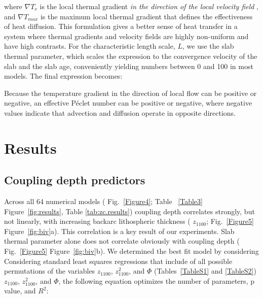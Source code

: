 \documentclass[draft,linenumbers]{agujournal2018} %
\providecommand{\DIFaddtex}[1]{{\protect\color{blue} \sf #1}} %
\providecommand{\DIFdeltex}[1]{{\protect\color{red} \scriptsize #1}} %
\providecommand{\DIFaddbegin}{} %
\providecommand{\DIFaddend}{} %
\providecommand{\DIFdelbegin}{} %
\providecommand{\DIFdelend}{} %
\providecommand{\DIFadd}[1]{\texorpdfstring{\DIFaddtex{#1}}{#1}} %
\providecommand{\DIFdel}[1]{\texorpdfstring{\DIFdeltex{#1}}{}} %
\newcommand{\DIFscaledelfig}{0.3}
\newlength{\DIFdelgraphicswidth} %
\newlength{\DIFdelgraphicsheight} %
\newcommand{\DIFaddincludegraphics}[2][]{{\color{blue}\fbox{\DIFOincludegraphics[#1]{#2}}}} %
\newcommand{\DIFdelincludegraphics}[2][]{%
\sbox{\DIFdelgraphicsbox}{\DIFOincludegraphics[#1]{#2}}%
\settoboxwidth{\DIFdelgraphicswidth}{\DIFdelgraphicsbox} %
\settoboxtotalheight{\DIFdelgraphicsheight}{\DIFdelgraphicsbox} %
\scalebox{\DIFscaledelfig}{%
\parbox[b]{\DIFdelgraphicswidth}{\usebox{\DIFdelgraphicsbox}\\[-\baselineskip] \rule{\DIFdelgraphicswidth}{0em}}\llap{\resizebox{\DIFdelgraphicswidth}{\DIFdelgraphicsheight}{%
\setlength{\unitlength}{\DIFdelgraphicswidth}%
\begin{picture}(1,1)%
\thicklines\linethickness{2pt} %
{\color[rgb]{1,0,0}\put(0,0){\framebox(1,1){}}}%
{\color[rgb]{1,0,0}\put(0,0){\line( 1,1){1}}}%
{\color[rgb]{1,0,0}\put(0,1){\line(1,-1){1}}}%
\end{picture}%
}\hspace*{3pt}}} %
} %
\DeclareRobustCommand{\DIFaddbegin}{\DIFOaddbegin \let\includegraphics\DIFaddincludegraphics} %
\DeclareRobustCommand{\DIFaddend}{\DIFOaddend \let\includegraphics\DIFOincludegraphics} %
\DeclareRobustCommand{\DIFdelbegin}{\DIFOdelbegin \let\includegraphics\DIFdelincludegraphics} %
\DeclareRobustCommand{\DIFdelend}{\DIFOaddend \let\includegraphics\DIFOincludegraphics} %
\begin{document}
\DIFdel{where $\nabla T_v$ is the local thermal gradient }%
\textit{\DIFdel{in the direction of the local velocity field}}%
\DIFdel{, and $\nabla T_{max}$ is the maximum local thermal gradient that defines the effectiveness of heat diffusion. This formulation gives a better sense of heat transfer in a system where thermal gradients and velocity fields are highly non-uniform and have high contrasts. For the characteristic length scale, $L$, we use the slab thermal parameter, which scales the expression to the convergence velocity of the slab and the slab age, conveniently yielding numbers between 0 and 100 in most models. The final expression becomes:
}%


\DIFdel{Because the temperature gradient in the direction of local flow can be positive or negative, an effective P\'{e}clet number can be positive or negative, where negative values indicate that advection and diffusion operate in opposite directions.
}%

\DIFdelend \section{Results}
\DIFaddbegin

\DIFaddend \subsection{Coupling depth predictors}
\DIFaddbegin

\DIFaddend Across all 64 numerical models (\DIFdelbegin \DIFdel{Fig.~\ref{Figure4}; Table
~\ref{Table3}}\DIFdelend \DIFaddbegin \DIFadd{Figure~\ref{fig:results}, Table
\ref{tab:zc.results}}\DIFaddend ) coupling depth correlates strongly, but not
linearly, with increasing backarc lithospheric thickness
(\DIFdelbegin \DIFdel{$z_{1100}$; Fig.~\ref{Figure5}}\DIFdelend \DIFaddbegin \DIFadd{Figure~\ref{fig:biv}}\DIFaddend a). This correlation is a key result of our
experiments. Slab thermal parameter alone does not correlate obviously
with coupling depth (\DIFdelbegin \DIFdel{Fig.~\ref{Figure5}}\DIFdelend \DIFaddbegin \DIFadd{Figure~\ref{fig:biv}}\DIFaddend b). \DIFdelbegin \DIFdel{We determined the best fit model by considering }\DIFdelend \DIFaddbegin \DIFadd{Considering }\DIFaddend standard least
squares regressions \DIFdelbegin \DIFdel{that include }\DIFdelend \DIFaddbegin \DIFadd{of }\DIFaddend all possible permutations of the variables
\DIFdelbegin \DIFdel{$z_{1100}$, $z_{1100}^2$, and $\Phi$ (Tables~\ref{TableS1} and \ref{TableS2})}\DIFdelend \DIFaddbegin \DIFadd{\(z_{1100}\), \(z_{1100}^{2}\), and \(\Phi\), the following equation
optimizes the number of parameters, p value, and \(R^{2}\)}\DIFaddend :
\end{document}
